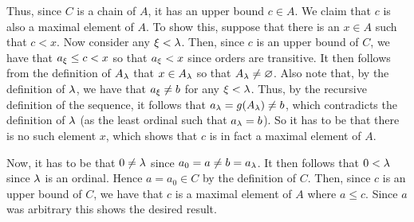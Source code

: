 {{    Thus, since $C$ is a chain of $A$, it has an upper bound $c \in A$.
    We claim that $c$ is also a maximal element of $A$.
    To show this, suppose that there is an $x \in A$ such that $c < x$.
    Now consider any $\xi < \lambda$.
    Then, since $c$ is an upper bound of $C$, we have that $a_\xi \leq c < x$ so that $a_\xi < x$ since orders are transitive.
    It then follows from the definition of $A_\lambda$ that $x \in A_\lambda$ so that $A_\lambda \neq \varnothing$.
    Also note that, by the definition of $\lambda$, we have that $a_\xi \neq b$ for any $\xi < \lambda$.
    Thus, by the recursive definition of the sequence, it follows that $a_\lambda = g(A_\lambda) \neq b$, which contradicts the definition of $\lambda$ (as the least ordinal such that $a_\lambda = b$).
    So it has to be that there is no such element $x$, which shows that $c$ is in fact a maximal element of $A$.

    Now, it has to be that $0 \neq \lambda$ since $a_0 = a \neq b = a_\lambda$.
    It then follows that $0 < \lambda$ since $\lambda$ is an ordinal.
    Hence $a = a_0 \in C$ by the definition of $C$.
    Then, since $c$ is an upper bound of $C$, we have that $c$ is a maximal element of $A$ where $a \leq c$.
    Since $a$ was arbitrary this shows the desired result.
  }
}
